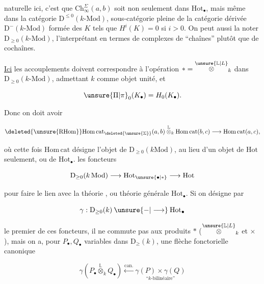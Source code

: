 
naturelle ici, c'est que $\mathrm{Ch}_{\infty}^{\Sigma}(a,b)$ soit non seulement dans $\mathrm{Hot}_{\bullet}$, mais même dans la catégorie   $\mathrm{D}^{\leq 0}(k\text{-}\mathrm{Mod})$, sous-catégorie pleine de la catégorie dérivée $\mathrm D^{-}(k\text{-}\mathrm{Mod})$ formée des $K$ tels que $H^i(K)=0$ si $i>0$. On peut aussi la noter $\mathrm D_{\geq 0}(k\text{-}\mathrm{Mod})$, l'interprétant en termes de complexes de ``chaînes'' plutôt que de cochaînes. 

\uline{Ici} les accouplements doivent correspondre à l'opération $*=\overset{\unsure{\mathbb L|L}}{\otimes}_{k}$ dans $\mathrm D_{\geq 0}(k\text{-}\mathrm{Mod})$, admettant $k$ comme objet unité, et

\[
 \unsure{\Pi|\pi}_0(K_\bullet)=H_0(K_\bullet).
\]

Donc on doit avoir 

\[
 \deleted{\unsure{\mathrm{RHom}}}\mathrm{Hom\,cat}_{\deleted{\unsure{\Sigma}}}(a,b)
 \overset{\mathbb L}{\otimes}_k\mathrm{Hom\,cat}(b,c)\longrightarrow\mathrm{Hom\,cat}(a,c),
\]

où cette fois $\mathrm{Hom\,cat}$ désigne l'objet de $\mathrm D_{\geq 0}(k\mathrm{Mod})$, au lieu d'un objet de $\mathrm{Hot}$ seulement, ou de $\mathrm{Hot}_{\bullet}$.  les foncteurs

\[
 \mathrm D_{\geq 0}(k\,\mathrm{Mod})\longrightarrow\mathrm{Hot}_{\unsure{\bullet|*}}\longrightarrow\mathrm{Hot}
\]


pour faire le lien avec la théorie , ou théorie générale  $\mathrm{Hot}_{\bullet}$. Si on désigne par

\[
 \gamma:\mathrm D_{\geq 0}(k)\mathbin{\unsure{-|\longrightarrow}}\mathrm{Hot}_{\bullet}
\]

le premier de ces foncteurs, il ne commute pas aux produits $*$ ($\overset{\unsure{\mathbb L|L}}{\otimes}_k$ et $\times$ ), mais on a, pour $P_\bullet,Q_\bullet$ variables dans $\mathrm D_{\geq}(k)$, une flèche fonctorielle canonique

\[
 \gamma(P_\bullet\overset{\mathbb L}{\otimes}_k Q_\bullet)
 \xleftarrow{\mathrm{can.}}\underset{\text{``$k$-bilinéaire''}}{\gamma(P)\times\gamma(Q)}
\]

